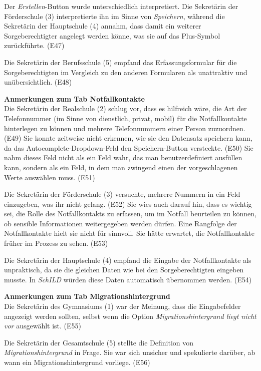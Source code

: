 Der \textit{Erstellen}-Button wurde unterschiedlich interpretiert. Die Sekretärin der Förderschule (3) interpretierte ihn im Sinne von \textit{Speichern}, während die Sekretärin der Hauptschule (4) annahm, dass damit ein weiterer Sorgeberechtigter angelegt werden könne, was sie auf das Plus-Symbol zurückführte. (E47)

Die Sekretärin der Berufsschule (5) empfand das Erfassungsformular für die Sorgeberechtigten im Vergleich zu den anderen Formularen als \glqq unattraktiv\grqq{} und \glqq unübersichtlich\grqq{}. (E48)

\textbf{Anmerkungen zum Tab \glqq Notfallkontakte\grqq{}}\\
Die Sekretärin der Realschule (2) schlug vor, dass es hilfreich wäre, die Art der Telefonnummer (im Sinne von dienstlich, privat, mobil) für die Notfallkontakte hinterlegen zu können und mehrere Telefonnummern einer Person zuzuordnen. (E49) Sie konnte zeitweise nicht erkennen, wie sie den Datensatz speichern kann, da das Autocomplete-Dropdown-Feld den Speichern-Button versteckte. (E50) Sie nahm dieses Feld nicht als ein Feld wahr, das man benutzerdefiniert ausfüllen kann, sondern als ein Feld, in dem man zwingend einen der vorgeschlagenen Werte auswählen muss. (E51)

Die Sekretärin der Förderschule (3) versuchte, mehrere Nummern in ein Feld einzugeben, was ihr nicht gelang. (E52) Sie wies auch darauf hin, dass es wichtig sei, die Rolle des Notfallkontakts zu erfassen, um im Notfall beurteilen zu können, ob sensible Informationen weitergegeben werden dürfen. Eine Rangfolge der Notfallkontakte hielt sie nicht für sinnvoll. Sie hätte erwartet, die Notfallkontakte früher im Prozess zu sehen. (E53)

Die Sekretärin der Hauptschule (4) empfand die Eingabe der Notfallkontakte als unpraktisch, da sie die gleichen Daten wie bei den Sorgeberechtigten eingeben musste. In \textit{SchILD} würden diese Daten automatisch übernommen werden. (E54)

\textbf{Anmerkungen zum Tab \glqq Migrationshintergrund\grqq{}}\\
Die Sekretärin des Gymnasiums (1) war der Meinung, dass die Eingabefelder angezeigt werden sollten, selbst wenn die Option \textit{Migrationshintergrund liegt nicht vor\grqq} ausgewählt ist. (E55)

Die Sekretärin der Gesamtschule (5) stellte die Definition von \textit{Migrationshintergrund} in Frage. Sie war sich unsicher und spekulierte darüber, ab wann ein Migrationshintergrund vorliege. (E56)

